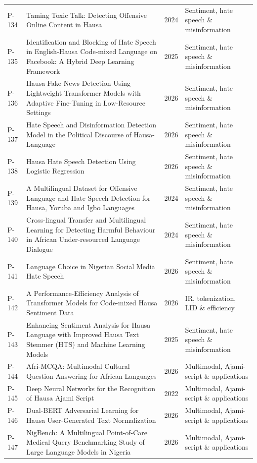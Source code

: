 \begin{longtable}{@{}p{} p{} p{} p{}@{}}
P-134 & Taming Toxic Talk: Detecting Offensive Online Content in Hausa & 2024 & Sentiment, hate speech \& misinformation \\
P-135 & Identification and Blocking of Hate Speech in English-Hausa Code-mixed Language on Facebook: A Hybrid Deep Learning Framework & 2025 & Sentiment, hate speech \& misinformation \\
P-136 & Hausa Fake News Detection Using Lightweight Transformer Models with Adaptive Fine-Tuning in Low-Resource Settings & 2026 & Sentiment, hate speech \& misinformation \\
P-137 & Hate Speech and Disinformation Detection Model in the Political Discourse of Hausa-Language & 2026 & Sentiment, hate speech \& misinformation \\
P-138 & Hausa Hate Speech Detection Using Logistic Regression & 2026 & Sentiment, hate speech \& misinformation \\
P-139 & A Multilingual Dataset for Offensive Language and Hate Speech Detection for Hausa, Yoruba and Igbo Languages & 2024 & Sentiment, hate speech \& misinformation \\
P-140 & Cross-lingual Transfer and Multilingual Learning for Detecting Harmful Behaviour in African Under-resourced Language Dialogue & 2024 & Sentiment, hate speech \& misinformation \\
P-141 & Language Choice in Nigerian Social Media Hate Speech & 2026 & Sentiment, hate speech \& misinformation \\
P-142 & A Performance-Efficiency Analysis of Transformer Models for Code-mixed Hausa Sentiment Data & 2026 & IR, tokenization, LID \& efficiency \\
P-143 & Enhancing Sentiment Analysis for Hausa Language with Improved Hausa Text Stemmer (HTS) and Machine Learning Models & 2025 & Sentiment, hate speech \& misinformation \\
P-144 & Afri-MCQA: Multimodal Cultural Question Answering for African Languages & 2026 & Multimodal, Ajami-script \& applications \\
P-145 & Deep Neural Networks for the Recognition of Hausa Ajami Script & 2022 & Multimodal, Ajami-script \& applications \\
P-146 & Dual-BERT Adversarial Learning for Hausa User-Generated Text Normalization & 2026 & Multimodal, Ajami-script \& applications \\
P-147 & NigBench: A Multilingual Point-of-Care Medical Query Benchmarking Study of Large Language Models in Nigeria & 2026 & Multimodal, Ajami-script \& applications \\

\end{longtable}
